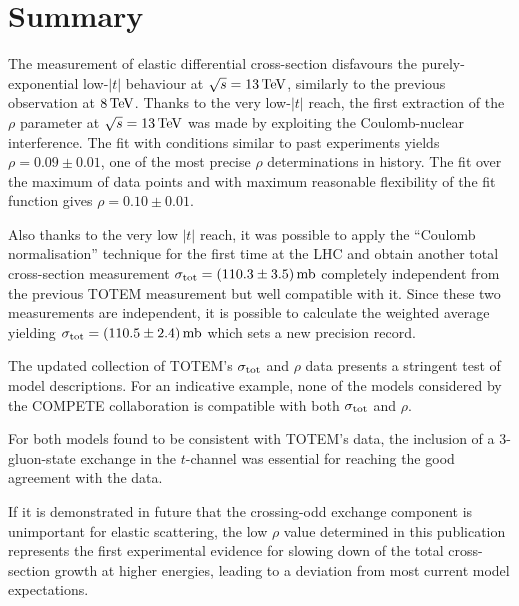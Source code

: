 \section{Summary}
\label{sec:summary}

The measurement of elastic differential cross-section disfavours the purely-exponential low-$|t|$ behaviour at $\sqrt s = 13\,{\rm TeV}$, similarly to the previous observation at $8\,{\rm TeV}$. Thanks to the very low-$|t|$ reach, the first extraction of the $\rho$ parameter at $\sqrt s = 13\,{\rm TeV}$ was made by exploiting the Coulomb-nuclear interference. The fit with conditions similar to past experiments yields $\rho = 0.09 \pm 0.01$, one of the most precise $\rho$ determinations in history. The fit over the maximum of data points and with maximum reasonable flexibility of the fit function gives $\rho = 0.10 \pm 0.01$.

Also thanks to the very low $|t|$ reach, it was possible to apply the ``Coulomb normalisation'' technique for the first time at the LHC and obtain another total cross-section measurement $\sigma_{\rm tot} = (110.3 \pm 3.5)\,{\rm mb}$ completely independent from the previous TOTEM measurement \cite{totem-13tev-90m} but well compatible with it. Since these two measurements are independent, it is possible to calculate the weighted average yielding $\sigma_{\rm tot} = (110.5 \pm 2.4)\,{\rm mb}$ which sets a new precision record.

The updated collection of TOTEM's $\sigma_{\rm tot}$ and $\rho$ data presents a stringent test of model descriptions. For an indicative example, none of the models considered by the COMPETE collaboration is compatible with both $\sigma_{\rm tot}$ and $\rho$.

For both models found to be consistent with TOTEM's data, the inclusion of a 3-gluon-state exchange in the $t$-channel was essential for reaching the good agreement with the data.

If it is demonstrated in future that the crossing-odd exchange component is unimportant for elastic scattering, the low $\rho$ value determined in this publication represents the first experimental evidence for slowing down of the total cross-section growth at higher energies, leading to a deviation from most current model expectations.
